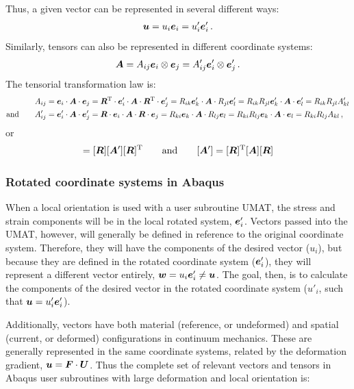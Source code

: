 \documentclass[10pt,letterpaper,oneside]{report}
\newcommand{\ten}[1]{\mbox{\boldmath $#1$}{}}
\newcommand{\scas}[1]{\mbox{{\scriptsize{${\rm{#1}}$}}}{}}
\begin{document}
Thus, a given vector can be represented in several different ways:
\begin{align}
\ten{u} = u_i \ten{e}_i = u'_i \ten{e}'_i \, .
\end{align}
Similarly, tensors can also be represented in different coordinate systems:
\begin{align}
\ten{A} = A_{ij} \ten{e}_i \otimes \ten{e}_j = A'_{ij} \ten{e}'_i \otimes \ten{e}'_j \, .
\end{align}
The tensorial transformation law is:
\begin{align}
A_{ij} &
= \ten{e}_i \cdot \ten{A} \cdot \ten{e}_j 
= \ten{R}^{\scas{T}} \cdot \ten{e}'_i \cdot \ten{A} \cdot \ten{R}^{\scas{T}} \cdot \ten{e}'_j 
= R_{ik} \ten{e}'_k \cdot \ten{A} \cdot R_{jl} \ten{e}'_l 
= R_{ik} R_{jl} \ten{e}'_k \cdot \ten{A} \cdot \ten{e}'_l 
= R_{ik} R_{jl} A'_{kl} 
\\ \text{and} \qquad
A'_{ij} &
= \ten{e}'_i \cdot \ten{A} \cdot \ten{e}'_j 
= \ten{R} \cdot \ten{e}_i \cdot \ten{A} \cdot \ten{R} \cdot \ten{e}_j 
= R_{ki} \ten{e}_k \cdot \ten{A} \cdot R_{lj} \ten{e}_l 
= R_{ki} R_{lj} \ten{e}_k \cdot \ten{A} \cdot \ten{e}_l 
= R_{ki} R_{lj} A_{kl} \, , 
\end{align}
or 
\begin{align}
[ \ten{A} ] = [ \ten{R} ] [ \ten{A}' ] [ \ten{R} ]^{\scas{T}}
\qquad \text{and} \qquad
[ \ten{A}' ] = [ \ten{R} ]^{\scas{T}} [ \ten{A} ] [ \ten{R} ] 
\end{align}


\subsubsection{Rotated coordinate systems in Abaqus}
When a local orientation is used with a user subroutine UMAT, the stress and strain components will be in the local rotated system, $\ten{e}'_i$.  Vectors passed into the UMAT, however, will generally  be defined in reference to the original coordinate system.  Therefore, they will have the components of the desired vector ($u_i$), but because they are defined in the rotated coordinate system ($\ten{e}'_i$), they will represent a different vector entirely, $\ten{w} = u_i \ten{e}'_i \neq \ten{u}$.  The goal, then, is to calculate the components of the desired vector in the rotated coordinate system ($u'_i$, such that $\ten{u} = u'_i \ten{e}'_i$).

Additionally, vectors have both material (reference, or undeformed) and spatial (current, or deformed) configurations in continuum mechanics.  These are generally represented in the same coordinate systems, related by the deformation gradient, $\ten{u} = \ten{F} \cdot \ten{U}$.  Thus the complete set of relevant vectors and tensors in Abaqus user subroutines with large deformation and local orientation is:
\end{document}
